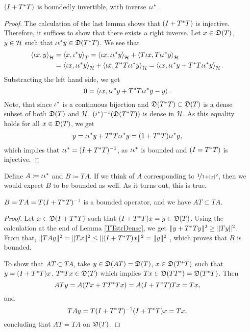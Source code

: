 \begin{prop}
 $(I + T ^{*} T)$ is boundedly
 invertible, with inverse $\iota \iota ^{*}$.
\end{prop}
\begin{proof}
  The calculation of the last lemma shows that $(I + T ^{*} T)$ is injective.
  Therefore, it suffices to show that there exists a right inverse.
  Let $x \in \mathfrak{D}(T)$, $y \in \mathcal{H}$ such that 
  $\iota  \iota ^{*} y \in \mathfrak{D}(T^{*} T)$.
  We see that
  \begin{align*}
\left\langle \iota x, y \right\rangle_{\mathcal{H}} &= \left\langle x, \iota ^{*} y \right\rangle_T = 
  \left\langle \iota x,\iota \iota ^{*} y \right\rangle_{\mathcal{H}} +
  \left\langle  T \iota x, T \iota \iota ^{*} y \right\rangle_{\mathcal{H}} \\
  &=\left\langle \iota x, \iota \iota ^{*} y \right\rangle_{\mathcal{H}}  +
  \left\langle \iota x , T ^{*} T \iota \iota ^{*} y \right\rangle_{\mathcal{H}}  =
  \left\langle \iota x, \iota \iota ^{*} y + T^{*} T \iota \iota ^{*} y \right\rangle_{\mathcal{H}} .
  \end{align*}
    Substracting the left hand side, we get
  \[
   0 = \left\langle \iota x , \iota \iota ^{*} y + T^{*} T \iota \iota ^{*} y - y \right\rangle.
  \]
  Note, that since $\iota ^{*}$ is a continuous bijection and $\mathfrak{D}(T ^{*} T)
  \subset \mathfrak{D}(T)$ is a
  dense subset of both $\mathfrak{D}(T)$ and $\mathcal{H}$, $(i ^{*}) ^{-1} (\mathfrak{D}(T ^{*} T))$ is dense
  in $\mathcal{H}$. As this equality holds for all $x \in \mathfrak{D}(T)$, we get
  \begin{align*}
  y=\iota \iota ^{*} y + T^{*} T \iota \iota ^{*} y 
  = (1+ T ^{*} T) \iota \iota ^{*} y,
  \end{align*}
  which implies that $ \iota \iota ^{*} = ( I + T ^{*} T) ^{-1}$,
  as $\iota \iota^{*} $ is bounded and $(I = T^{*} T)$ is injective.
\end{proof}

Define $A \coloneqq \iota \iota ^{*}$ and $B \coloneqq TA$. 
If we think of $A$ corresponding to $\nicefrac{1}{1 + |x|^2}$, then we would expect
$B$ to be bounded as well.
As it turns out, this is true.
\begin{lem}\label{BBounded}
 $B = TA = T(I + T ^{*} T)^{-1}$ is a bounded operator, and we have
 $AT \subset TA$.
\end{lem}



\begin{proof}
 Let $x \in \mathfrak{D}(I + T ^{*} T)$ such that $(I + T ^{*} T)x = y \in \mathfrak{D}(T)$.
 Using the calculation at the end of Lemma \ref{TTstrDense}, we get 
 $\| y + T^{*} T y \|^2 \geq \|Ty\|^2$.
From that, $\| TAy\|^2 = \| Tx \| ^2 \leq \| (I + T ^{*} T)x \|^2 = \| y \| ^2$
, which proves that $B$ is bounded. 

To show that $AT \subset TA$, take $y \in \mathfrak{D}(AT) = \mathfrak{D}(T)$,
$x \in \mathfrak{D}(T ^{*} T)$ such that $y = ( I +  T ^{*} T)x$. $T ^{*} T x \in \mathfrak{D}(T)$
which implies $Tx \in \mathfrak{D}(TT^{*}) = \mathfrak{D}(T^{*} T)$. Then 
\[
 ATy = A(Tx + T T^{*} T x) = A(I + T^{*} T)Tx= Tx,
\]
and
\[
 TAy= T(I+ T^{*} T)^{-1} (I + T ^{*} T)x=Tx,
\]
concluding that $AT = TA$ on $\mathfrak{D}(T)$.

\end{proof}

